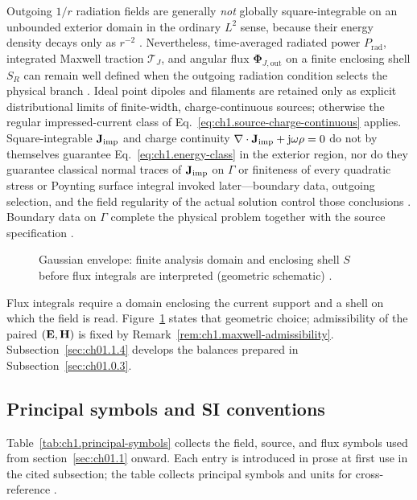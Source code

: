 Outgoing \(1/r\) radiation fields are generally \emph{not} globally square-integrable on an unbounded exterior domain in the ordinary \(L^2\) sense, because their energy density decays only as \(r^{-2}\) \cite{stratton1941}. Nevertheless, time-averaged radiated power \(P_{\mathrm{rad}}\), integrated Maxwell traction \(\boldsymbol{\mathcal{T}}_J\), and angular flux \(\boldsymbol{\Phi}_{J,\mathrm{out}}\) on a finite enclosing shell \(S_R\) can remain well defined when the outgoing radiation condition selects the physical branch \cite{stratton1941}. Ideal point dipoles and filaments are retained only as explicit distributional limits of finite-width, charge-continuous sources; otherwise the regular impressed-current class of Eq.~\eqref{eq:ch1.source-charge-continuous} applies. Square-integrable \(\mathbf{J}_{\mathrm{imp}}\) and charge continuity \(\nabla\cdot\mathbf{J}_{\mathrm{imp}}+\mathrm{j}\omega\rho=0\) do not by themselves guarantee Eq.~\eqref{eq:ch1.energy-class} in the exterior region, nor do they guarantee classical normal traces of \(\mathbf{J}_{\mathrm{imp}}\) on \(\Gamma\) or finiteness of every quadratic stress or Poynting surface integral invoked later---boundary data, outgoing selection, and the field regularity of the actual solution control those conclusions \cite{stratton1941}. Boundary data on \(\Gamma\) complete the physical problem together with the source specification \cite{maxwell1873,stratton1941}.
\label{eq:ch1.admissible-space}

\begin{figure}[t]
\centering
\VolIPhysFig{\VolIPhysGaussianWaist}
\caption{Gaussian envelope: finite analysis domain and enclosing shell $S$ before flux integrals are interpreted (geometric schematic) \cite{allen1992,stratton1941}.}
\label{fig:ch1.wp-gaussian-waist}
\end{figure}

Flux integrals require a domain enclosing the current support and a shell on which the field is read. Figure~\ref{fig:ch1.wp-gaussian-waist} states that geometric choice; admissibility of the paired $(\mathbf{E},\mathbf{H})$ is fixed by Remark~\ref{rem:ch1.maxwell-admissibility}. Subsection~\ref{sec:ch01.1.4} develops the balances prepared in Subsection~\ref{sec:ch01.0.3}.

\subsection{Principal symbols and SI conventions}
\label{sec:ch01.0.symbols}

Table~\ref{tab:ch1.principal-symbols} collects the field, source, and flux symbols used from section~\ref{sec:ch01.1} onward. Each entry is introduced in prose at first use in the cited subsection; the table collects principal symbols and units for cross-reference \cite{stratton1941,harrington2001}.

